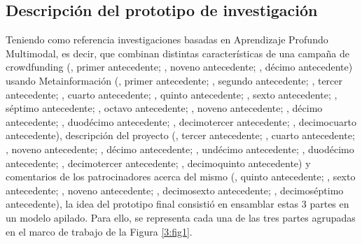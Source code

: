 \subsection{Descripción del prototipo de investigación}
Teniendo como referencia investigaciones basadas en Aprendizaje Profundo Multimodal, es decir, que combinan distintas características de una campaña de crowdfunding (\citeauthor{pr_kamath2018suplearn}, primer antecedente; \citeauthor{pr_jin2019dayssuccess}, noveno antecedente; \citeauthor{pr_cheng2019deeplearning}, décimo antecedente) usando Metainformación (\citeauthor{pr_kamath2018suplearn}, primer antecedente; \citeauthor{pr_beckwith2016predcrowd}, segundo antecedente; \citeauthor{pr_zhou2015projectdesc}, tercer antecedente; \citeauthor{pr_yuan2016textanalytics}, cuarto antecedente; \citeauthor{pr_chen2015predcrowd}, quinto antecedente; \citeauthor{pr_li2016predcrowd}, sexto antecedente; \citeauthor{pr_kaur2017socmedcrowd}, séptimo antecedente; \citeauthor{pr_yu2018deeplearning}, octavo antecedente; \citeauthor{pr_jin2019dayssuccess}, noveno antecedente; \citeauthor{pr_cheng2019deeplearning}, décimo antecedente; \citeauthor{pr_mitra2014phrases}, duodécimo antecedente; \citeauthor{pr_sawhney2016usingLT}, decimotercer antecedente; \citeauthor{pr_chen2013kickpredict}, decimocuarto antecedente), descripción del proyecto (\citeauthor{pr_zhou2015projectdesc}, tercer antecedente; \citeauthor{pr_yuan2016textanalytics}, cuarto antecedente; \citeauthor{pr_jin2019dayssuccess}, noveno antecedente; \citeauthor{pr_cheng2019deeplearning}, décimo antecedente; \citeauthor{pr_chen2019keywords_crowdfunding}, undécimo antecedente; \citeauthor{pr_mitra2014phrases}, duodécimo antecedente; \citeauthor{pr_sawhney2016usingLT}, decimotercer antecedente; \citeauthor{pr_chaichi2019nlp_3dprinting}, decimoquinto antecedente) y comentarios de los patrocinadores acerca del mismo (\citeauthor{pr_chen2015predcrowd}, quinto antecedente; \citeauthor{pr_li2016predcrowd}, sexto antecedente; \citeauthor{pr_jin2019dayssuccess}, noveno antecedente; \citeauthor{pr_lee2018contentDL}, decimosexto antecedente; \citeauthor{pr_shafqat2019topicpredictions}, decimoséptimo antecedente), la idea del prototipo final consistió en ensamblar estas 3 partes en un modelo apilado. Para ello, se representa cada una de las tres partes agrupadas en el marco de trabajo de la Figura \ref{3:fig1}.
